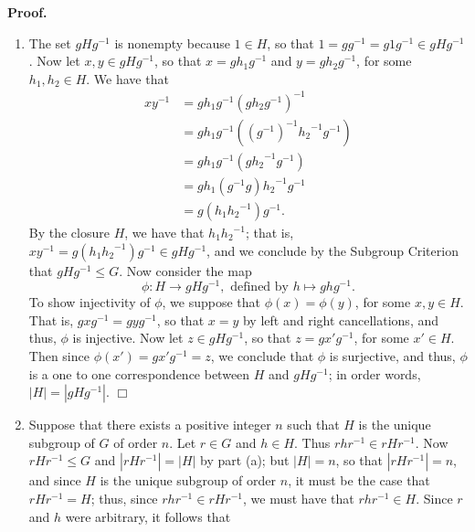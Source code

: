 \documentclass[9pt]{article}
\newcommand{\qed}{\hfill \ensuremath{\Box}}
\begin{document}
\begin{enumerate}
      \textbf{Proof.}

      \begin{enumerate}
         \item The set $gHg^{-1}$ is nonempty because $1 \in H$, so that
               $1 = gg^{-1} = g1g^{-1} \in gHg^{-1}$. Now let
               $x, y \in gHg^{-1}$, so that $x = gh_1g^{-1}$ and
               $y = gh_2g^{-1}$, for some $h_1, h_2 \in H$. We have that
               \begin{align*}
                  xy^{-1} &= gh_1g^{-1}(gh_2g^{-1})^{-1} \\
                     &= gh_1g^{-1}((g^{-1})^{-1}{h_2}^{-1}g^{-1}) \\
                     &= gh_1g^{-1}(g{h_2}^{-1}g^{-1}) \\
                     &= gh_1(g^{-1}g){h_2}^{-1}g^{-1} \\
                     &= g(h_1{h_2}^{-1})g^{-1}.
               \end{align*}
               By the closure $H$, we have that $h_1{h_2}^{-1}$; that is,
               $xy^{-1} = g(h_1{h_2}^{-1})g^{-1} \in gHg^{-1}$, and we conclude
               by the Subgroup Criterion that $gHg^{-1} \le G$. Now consider the
               map
               $$\phi : H \rightarrow gHg^{-1}, \text{ defined by }
                   h \mapsto ghg^{-1}.$$
               To show injectivity of $\phi$, we suppose that
               $\phi(x) = \phi(y)$, for some $x, y \in H$. That is,
               $gxg^{-1} = gyg^{-1}$, so that $x = y$ by left and right 
               cancellations, and thus, $\phi$ is injective. Now let
               $z \in gHg^{-1}$, so that $z = gx'g^{-1}$, for some $x' \in H$. 
               Then since $\phi(x') = gx'g^{-1} = z$, we conclude that $\phi$ is 
               surjective, and thus, $\phi$ is a one to one correspondence 
               between $H$ and $gHg^{-1}$; in order words, $|H| = |gHg^{-1}|$.
               \qed
         \item Suppose that there exists a positive integer $n$ such that
               $H$ is the unique subgroup of $G$ of order $n$. Let $r \in G$ and
               $h \in H$. Thus $rhr^{-1} \in rHr^{-1}$. Now $rHr^{-1} \le G$
               and $|rHr^{-1}| = |H|$ by part (a); but $|H| = n$, so that
               $|rHr^{-1}| = n$, and since $H$ is the unique subgroup of order
               $n$, it must be the case that $rHr^{-1} = H$; thus, since
               $rhr^{-1} \in rHr^{-1}$, we must have that $rhr^{-1} \in H$.
               Since $r$ and $h$ were arbitrary, it follows that

\end{enumerate}
\end{enumerate}
\end{document}
